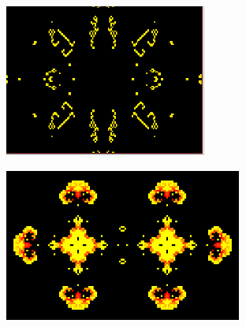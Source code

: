 \documentclass[12pt]{article}
\numberwithin{figure}{section} %
\begin{document}
\begin{figure}[H]
 \begin{subfigure}{0.45\textwidth}
     \centering
     \includegraphics[width=\linewidth]{Section1/8.1}
     \subcaption{}
   \end{subfigure}
     \begin{subfigure}{0.53\textwidth}
     \centering
     \includegraphics[width=\linewidth]{Section1/8.2}
     \subcaption{}
   \end{subfigure}
     \begin{subfigure}{0.42\textwidth}
     \centering

\end{subfigure}
\end{figure}
\end{document}
